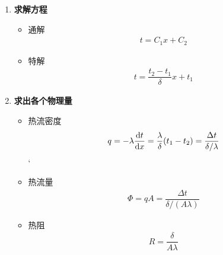 \begin{enumerate}[\textbf{步骤} 2 ]
	\item \textbf{求解方程}
	\begin{itemize}
		\item 通解
		\vspace*{-1.5em}
		\begin{align}
			t = C_1 x + C_2
		\end{align}
		\vspace*{-2.5em}
		\item 特解
		\vspace*{-1em}
		\begin{align}
			t = \dfrac{t_2 - t_1}{\delta} x + t_1
		\end{align}
		\vspace*{-2em}
	\end{itemize}
	
	\item \textbf{求出各个物理量}
	\begin{itemize}
		\item 热流密度
		\vspace*{-1em}
		\begin{align}
			q = - \lambda \dfrac{{\rm{d}} t}{{\rm{d}} x} = \dfrac{\lambda}{\delta}(t_1 - t_2) = \dfrac{\Delta t}{\delta / \lambda}
		\end{align}
		\vspace*{-2em}
	`	\item 热流量
		\vspace*{-1em}
		\begin{align}
			\varPhi = q A = \dfrac{\Delta t}{\delta /(A \lambda)}
		\end{align}
		\vspace*{-2em}
		\item 热阻
		\vspace*{-1em}
		\begin{align}
			R = \dfrac{\delta }{A \lambda}
		\end{align}
		\vspace*{-2em}
	\end{itemize}
\end{enumerate}

